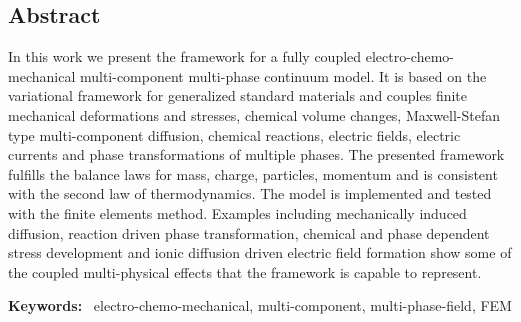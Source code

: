 \newpage

\subsection*{Abstract}
In this work we present the framework for a fully coupled electro-chemo-mechanical multi-component multi-phase continuum model. It is based on the variational framework for generalized standard materials and couples finite mechanical deformations and stresses, chemical volume changes, Maxwell-Stefan type multi-component diffusion, chemical reactions, electric fields, electric currents and phase transformations of multiple phases. The presented framework fulfills the balance laws for mass, charge, particles, momentum and is consistent with the second law of thermodynamics. The model is implemented and tested with the finite elements method. Examples including mechanically induced diffusion, reaction driven phase transformation, chemical and phase dependent stress development and ionic diffusion driven electric field formation show some of the coupled multi-physical effects that the framework is capable to represent. 

\textbf{Keywords: }~electro-chemo-mechanical, multi-component, multi-phase-field, FEM

